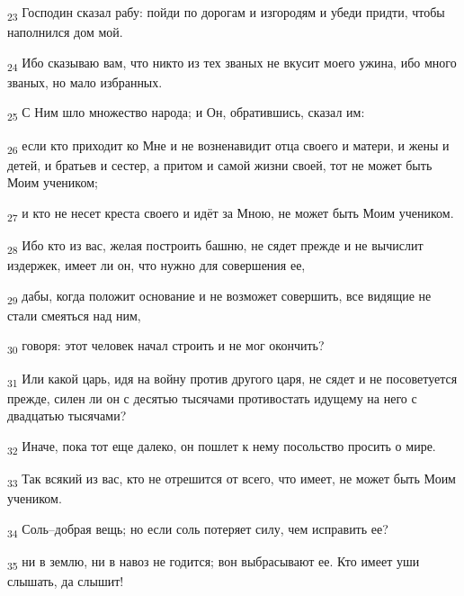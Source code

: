 \begin{tcolorbox}
\textsubscript{23} Господин сказал рабу: пойди по дорогам и изгородям и убеди придти, чтобы наполнился дом мой.
\end{tcolorbox}
\begin{tcolorbox}
\textsubscript{24} Ибо сказываю вам, что никто из тех званых не вкусит моего ужина, ибо много званых, но мало избранных.
\end{tcolorbox}
\begin{tcolorbox}
\textsubscript{25} С Ним шло множество народа; и Он, обратившись, сказал им:
\end{tcolorbox}
\begin{tcolorbox}
\textsubscript{26} если кто приходит ко Мне и не возненавидит отца своего и матери, и жены и детей, и братьев и сестер, а притом и самой жизни своей, тот не может быть Моим учеником;
\end{tcolorbox}
\begin{tcolorbox}
\textsubscript{27} и кто не несет креста своего и идёт за Мною, не может быть Моим учеником.
\end{tcolorbox}
\begin{tcolorbox}
\textsubscript{28} Ибо кто из вас, желая построить башню, не сядет прежде и не вычислит издержек, имеет ли он, что нужно для совершения ее,
\end{tcolorbox}
\begin{tcolorbox}
\textsubscript{29} дабы, когда положит основание и не возможет совершить, все видящие не стали смеяться над ним,
\end{tcolorbox}
\begin{tcolorbox}
\textsubscript{30} говоря: этот человек начал строить и не мог окончить?
\end{tcolorbox}
\begin{tcolorbox}
\textsubscript{31} Или какой царь, идя на войну против другого царя, не сядет и не посоветуется прежде, силен ли он с десятью тысячами противостать идущему на него с двадцатью тысячами?
\end{tcolorbox}
\begin{tcolorbox}
\textsubscript{32} Иначе, пока тот еще далеко, он пошлет к нему посольство просить о мире.
\end{tcolorbox}
\begin{tcolorbox}
\textsubscript{33} Так всякий из вас, кто не отрешится от всего, что имеет, не может быть Моим учеником.
\end{tcolorbox}
\begin{tcolorbox}
\textsubscript{34} Соль--добрая вещь; но если соль потеряет силу, чем исправить ее?
\end{tcolorbox}
\begin{tcolorbox}
\textsubscript{35} ни в землю, ни в навоз не годится; вон выбрасывают ее. Кто имеет уши слышать, да слышит!
\end{tcolorbox}
